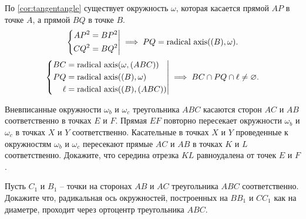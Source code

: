 \begin{tasks}
{                По \cref{cor:tangentangle} существует окружность $\omega$, которая касается прямой $AP$ в точке $A$, а прямой $BQ$ в точке $B$.
                \begin{equation}
                    \left\{\begin{aligned}
                            AP^2 &= BP^2 \\
                            CQ^2 &= BQ^2                 
                        \end{aligned}\right| \implies PQ = \operatorname{\text{radical axis}}((B), \omega).
                    \end{equation}
                    \begin{equation}
                        \left\{\begin{aligned}
                                BC &= \operatorname{\text{radical axis}}(\omega, (ABC)) \\ 
                                PQ &= \operatorname{\text{radical axis}}((B), \omega)\\
                                \ell &= \operatorname{\text{radical axis}}((B), (ABC))
                            \end{aligned}\right| \implies BC \cap PQ \cap \ell \neq \varnothing.
                        \end{equation}
                    }

                \item Вневписанные окружности $\omega_b$ и $\omega_c$ треугольника $ABC$ касаются сторон $AC$ и $AB$ соответственно в точках $E$ и $F$. Прямая $EF$ повторно пересекает окружности $\omega_b$ и $\omega_c$ в точках $X$ и $Y$ соответственно. Касательные в точках $X$ и $Y$ проведенные к окружностям $\omega_b$ и $\omega_c$ пересекают прямые $AC$ и $AB$ в точках $K$ и $L$ соответственно. Докажите, что середина отрезка $KL$ равноудалена от точек $E$ и $F$.


                \item \begin{tasks}
                    \item\label{lem:Hinradicalaxis}Пусть $C_1$ и $B_1$  -- точки на сторонах $AB$ и $AC$ треугольника $ABC$ соответственно. Докажите что, радикальная ось окружностей, построенных на $BB_1$ и $CC_1$ как на диаметре, проходит через ортоцентр треугольника $ABC$. 


\end{tasks}
\end{tasks}
